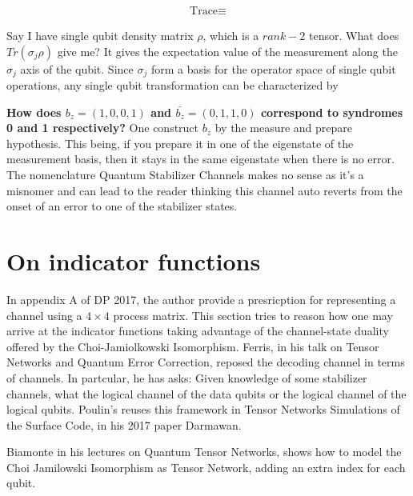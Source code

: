 \documentclass[%
 reprint,
amsmath,amssymb,
aps,
onecolumn,
]{revtex4-2}
\begin{document}
\begin{align*}
    \text{Trace} \equiv 
\end{align*}

Say I have single qubit density matrix $\rho$, which is a $rank-2$ tensor. What does $Tr(\sigma_j \rho)$ give me? It gives the expectation value of the measurement along the $\sigma_j$ axis of the qubit. Since ${\sigma_j}$ form a basis for the operator space of single qubit operations, any single qubit transformation can be characterized by 


\textbf{How does $b_z =(1,0,0,1)$ and $\bar{b_z} = (0,1,1,0)$ correspond to syndromes 0 and 1 respectively?}
One construct $b_z$ by the measure and prepare hypothesis. This being, if you prepare it in one of the eigenstate of the measurement basis, then it stays in the same eigenstate when there is no error. The nomenclature Quantum Stabilizer Channels makes no sense as it's a misnomer and can lead to the reader thinking this channel auto reverts from the onset of an error to one of the stabilizer states. 



\section{On indicator functions}
In appendix A of DP 2017, the author provide a presricption for representing a channel using a $4 \times 4$ process matrix. This section tries to reason how one may arrive at the indicator functions taking advantage of the channel-state duality offered by the Choi-Jamiolkowski Isomorphism. Ferris, in his talk on Tensor Networks and Quantum Error Correction, reposed the decoding channel in terms of channels. In partcular, he has asks: Given knowledge of some stabilizer channels, what the logical channel of the data qubits or the logical channel of the logical qubits. Poulin's reuses this framework in Tensor Networks Simulations of the Surface Code, in his 2017 paper Darmawan. 


Biamonte in his lectures on Quantum Tensor Networks, shows how to model the Choi Jamilowski Isomorphism as Tensor Network, adding an extra index for each qubit. 
\end{document}
